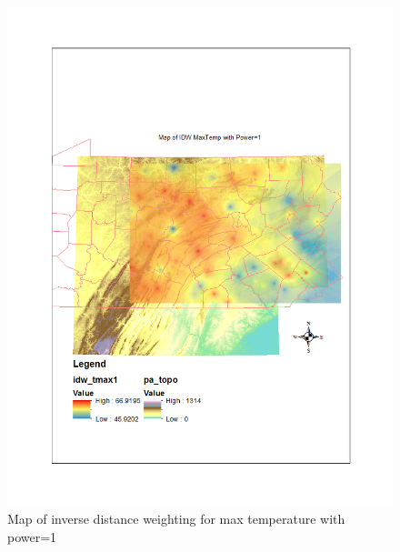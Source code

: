 \documentclass{article}\usepackage[]{graphicx}\usepackage[]{color}
\begin{document}
\begin{figure}
\includegraphics[scale=.9]{./figure/IDWmax1}
\caption{Map of inverse distance weighting for max temperature with power=1}
\label{idwmax1}
\end{figure}
\end{document}

